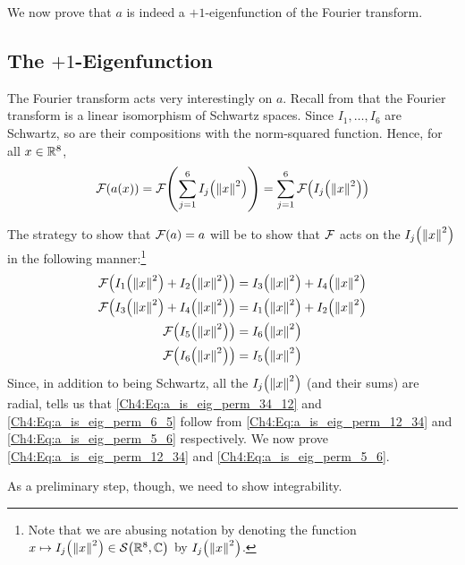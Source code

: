 We now prove that $a$ is indeed a $+1$-eigenfunction of the Fourier transform.

\subsection{The $+1$-Eigenfunction}

The Fourier transform acts very interestingly on $a$. Recall from  that the Fourier transform is a linear isomorphism of Schwartz spaces. Since $I_1, \ldots, I_6$ are Schwartz, so are their compositions with the norm-squared function. Hence, for all $x \in \mathbb{R}^8$,
\begin{align*}
    \mathcal{F}\!\left( a(x) \right)
    = \mathcal{F}\!\left( \sum_{j=1}^{6} I_j\!\left( \left\lVert x \right\rVert^2 \right) \right)
    = \sum_{j=1}^{6} \mathcal{F}\!\left( I_j\!\left( \left\lVert x \right\rVert^2 \right) \right)
\end{align*}

The strategy to show that $\mathcal{F}\!\left( a \right) = a$ will be to show that $\mathcal{F}$ acts on the $I_j\!\left( \left\lVert x \right\rVert^2 \right)$ in the following manner:\footnote{Note that we are abusing notation by denoting the function $x \mapsto I_j\!\left( \left\lVert x \right\rVert^2 \right) \in \mathcal{S}\!\left( \mathbb{R}^8, \mathbb{C} \right)$ by $I_j\!\left( \left\lVert x \right\rVert^2 \right)$.}
\begin{align}
    \F\of{I_1\of{\norm{x}^2} + I_2\of{\norm{x}^2}} &= I_3\of{\norm{x}^2} + I_4\of{\norm{x}^2} \label{Ch4:Eq:a_is_eig_perm_12_34} \\
    \F\of{I_3\of{\norm{x}^2} + I_4\of{\norm{x}^2}} &= I_1\of{\norm{x}^2} + I_2\of{\norm{x}^2} \label{Ch4:Eq:a_is_eig_perm_34_12} \\
    \F\of{I_5\of{\norm{x}^2}} &= I_6\of{\norm{x}^2} \label{Ch4:Eq:a_is_eig_perm_5_6} \\
    \F\of{I_6\of{\norm{x}^2}} &= I_5\of{\norm{x}^2} \label{Ch4:Eq:a_is_eig_perm_6_5}
\end{align}
Since, in addition to being Schwartz, all the $I_j\!\left( \left\lVert x \right\rVert^2 \right)$ (and their sums) are radial,  tells us that \eqref{Ch4:Eq:a_is_eig_perm_34_12} and \eqref{Ch4:Eq:a_is_eig_perm_6_5} follow from \eqref{Ch4:Eq:a_is_eig_perm_12_34} and \eqref{Ch4:Eq:a_is_eig_perm_5_6} respectively. We now prove \eqref{Ch4:Eq:a_is_eig_perm_12_34} and \eqref{Ch4:Eq:a_is_eig_perm_5_6}.

As a preliminary step, though, we need to show integrability.

